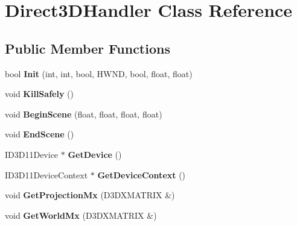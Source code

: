 \hypertarget{class_direct3_d_handler}{\section{Direct3\-D\-Handler Class Reference}
\label{class_direct3_d_handler}
}
\subsection*{Public Member Functions}
\begin{DoxyCompactItemize}
\item 
\hypertarget{class_direct3_d_handler_aea4ef32982cc0f44cad236d2085242c2}{bool {\bfseries Init} (int, int, bool, H\-W\-N\-D, bool, float, float)}\label{class_direct3_d_handler_aea4ef32982cc0f44cad236d2085242c2}

\item 
\hypertarget{class_direct3_d_handler_adc62b13c057556c843d3eb7e042ebaac}{void {\bfseries Kill\-Safely} ()}\label{class_direct3_d_handler_adc62b13c057556c843d3eb7e042ebaac}

\item 
\hypertarget{class_direct3_d_handler_a2d4dcb34f8ffd0f59318f27806cb8e39}{void {\bfseries Begin\-Scene} (float, float, float, float)}\label{class_direct3_d_handler_a2d4dcb34f8ffd0f59318f27806cb8e39}

\item 
\hypertarget{class_direct3_d_handler_a0de0efa670e068b9a9cdd876ad34f7bd}{void {\bfseries End\-Scene} ()}\label{class_direct3_d_handler_a0de0efa670e068b9a9cdd876ad34f7bd}

\item 
\hypertarget{class_direct3_d_handler_ac4f9d8dc8c24ef4f26c65736ee76c2c1}{I\-D3\-D11\-Device $\ast$ {\bfseries Get\-Device} ()}\label{class_direct3_d_handler_ac4f9d8dc8c24ef4f26c65736ee76c2c1}

\item 
\hypertarget{class_direct3_d_handler_a905fe49fd8288e0b5b88130a0d667705}{I\-D3\-D11\-Device\-Context $\ast$ {\bfseries Get\-Device\-Context} ()}\label{class_direct3_d_handler_a905fe49fd8288e0b5b88130a0d667705}

\item 
\hypertarget{class_direct3_d_handler_a2b6ec63d45c5441a367edd885dc01b44}{void {\bfseries Get\-Projection\-Mx} (D3\-D\-X\-M\-A\-T\-R\-I\-X \&)}\label{class_direct3_d_handler_a2b6ec63d45c5441a367edd885dc01b44}

\item 
\hypertarget{class_direct3_d_handler_a1dca98e67d3e5f83d5e0f469db62e1d7}{void {\bfseries Get\-World\-Mx} (D3\-D\-X\-M\-A\-T\-R\-I\-X \&)}\label{class_direct3_d_handler_a1dca98e67d3e5f83d5e0f469db62e1d7}


\end{DoxyCompactItemize}
